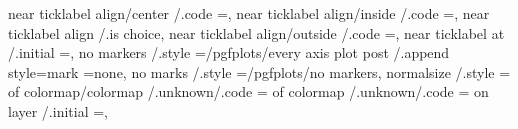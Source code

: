 {{{{{{{{{{{{{{{{{{{{{{{{{{{{{{{{{{{near ticklabel align/center                  /.code                                                                                    =\def\pgfplots@borderanchor@align{1},                                                                               
near ticklabel align/inside                  /.code                                                                                    =\def\pgfplots@borderanchor@align{0},                                                                               
near ticklabel align                         /.is choice,                                                                        
near ticklabel align/outside                 /.code                                                                                    =\def\pgfplots@borderanchor@align{2},                                                                               
near ticklabel at                            /.initial                                                                                 =,                                                                                                                  
no markers                                   /.style                                                                                   ={/pgfplots/every axis plot post                                                                      /.append style={mark         =none}},                                                                                                                  
no marks                                     /.style                                                                                   ={/pgfplots/no markers},                                                                                            
normalsize                                   /.style                                                                                   ={                                                                                                                  
of colormap/colormap                         /.unknown/.code                                                                           ={%
of colormap                                  /.unknown/.code                                                                           ={%
on layer                                     /.initial                                                                                 =,                                                                                                                  
}}}}}}}}}}}}}}}}}}}}}}}}}}}}}}}}}}}}}}
